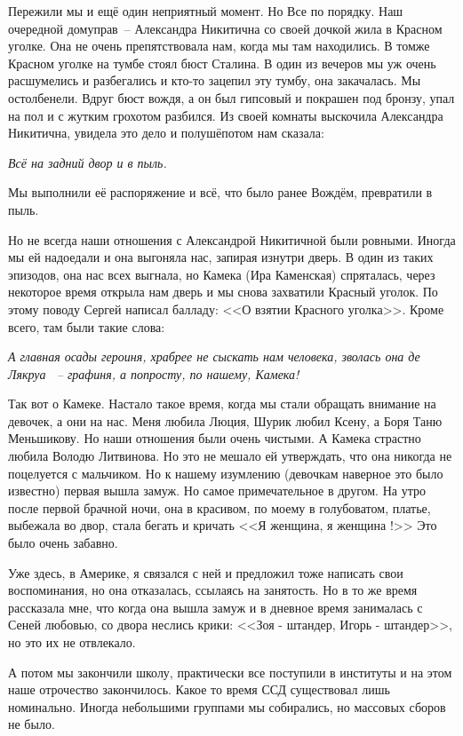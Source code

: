 Пережили мы и ещё один неприятный момент. Но Все по порядку. Наш очередной домуправ~-- Александра Никитична со своей дочкой жила в Красном уголке. Она не очень препятствовала нам, когда мы там находились. В томже Красном уголке на тумбе стоял бюст Сталина. В один из вечеров мы уж очень расшумелись и разбегались и кто-то зацепил эту тумбу, она закачалась. Мы остолбенели. Вдруг бюст вождя, а он был гипсовый и покрашен под бронзу, упал на пол и с жутким грохотом разбился. Из своей комнаты выскочила Александра Никитична, увидела это дело и полушёпотом нам сказала:

\textit{Всё на задний двор и в пыль.}

Мы выполнили её распоряжение и всё, что было ранее Вождём, превратили в пыль.

Но не всегда наши отношения с Александрой Никитичной были ровными. Иногда мы ей надоедали и она выгоняла нас, запирая изнутри дверь. В один из таких эпизодов, она нас всех выгнала, но Камека (Ира Каменская) спряталась, через некоторое время открыла нам дверь и мы снова захватили Красный уголок. По этому поводу Сергей написал балладу: <<О взятии Красного уголка>>. Кроме всего, там были такие слова:

\indent

{\itshape
А главная осады героиня, храбрее не сыскать нам человека, зволась она де Лякруа ~-- графиня, а попросту, по нашему, Камека!
}

\indent

Так вот о Камеке. Настало такое время, когда мы стали обращать внимание на девочек, а они на нас. Меня любила Люция, Шурик любил Ксену, а Боря Таню Меньшикову. Но наши отношения были очень чистыми. А Камека страстно любила Володю Литвинова. Но это не мешало ей утверждать, что она никогда не поцелуется с мальчиком. Но к нашему изумлению (девочкам наверное это было известно) первая вышла замуж. Но самое примечательное в другом. На утро после первой брачной ночи, она в красивом, по моему в голубоватом, платье, выбежала во двор, стала бегать и кричать <<Я женщина, я женщина !>> Это было очень забавно.

Уже здесь, в Америке, я связался с ней и предложил тоже написать свои воспоминания, но она отказалась, ссылаясь на занятость. Но в то же время рассказала мне, что когда она вышла замуж и в дневное время занималась с Сеней любовью, со двора неслись крики: <<Зоя - штандер, Игорь - штандер>>, но это их не отвлекало.

А потом мы закончили школу, практически все поступили в институты и на этом наше отрочество закончилось.
Какое то время ССД существовал лишь номинально. Иногда небольшими группами мы собирались, но массовых сборов не было.

